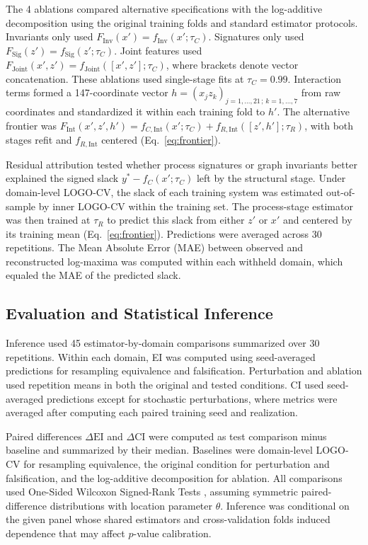 \documentclass{article}
\begin{document}
The 4 ablations compared alternative specifications with the log-additive decomposition using the original training folds and standard estimator protocols. Invariants only used $F_{\mathrm{Inv}}(x') = f_{\mathrm{Inv}}(x'; \tau_C)$. Signatures only used $F_{\mathrm{Sig}}(z') = f_{\mathrm{Sig}}(z'; \tau_C)$. Joint features used $F_{\mathrm{Joint}}(x', z') = f_{\mathrm{Joint}}([x', z']; \tau_C)$, where brackets denote vector concatenation. These ablations used single-stage fits at $\tau_C = 0.99$. Interaction terms formed a 147-coordinate vector $h = {(x_j z_k)}_{j=1,\ldots,21\,;\,k=1,\ldots,7}$ from raw coordinates and standardized it within each training fold to $h'$. The alternative frontier was $F_{\mathrm{Int}}(x', z', h') = f_{C,\mathrm{Int}}(x'; \tau_C) + f_{R,\mathrm{Int}}([z', h']; \tau_R)$, with both stages refit and $f_{R,\mathrm{Int}}$ centered (Eq.~\eqref{eq:frontier}).

Residual attribution tested whether process signatures or graph invariants better explained the signed slack $y^{*} - f_C(x'; \tau_C)$ left by the structural stage. Under domain-level LOGO-CV, the slack of each training system was estimated out-of-sample by inner LOGO-CV within the training set. The process-stage estimator was then trained at $\tau_R$ to predict this slack from either $z'$ or $x'$ and centered by its training mean (Eq.~\eqref{eq:frontier}). Predictions were averaged across 30 repetitions. The Mean Absolute Error (MAE) between observed and reconstructed log-maxima was computed within each withheld domain, which equaled the MAE of the predicted slack.

\subsection*{Evaluation and Statistical Inference}
\label{sec:si-stat-conventions}
Inference used 45 estimator-by-domain comparisons summarized over 30 repetitions. Within each domain, EI was computed using seed-averaged predictions for resampling equivalence and falsification. Perturbation and ablation used repetition means in both the original and tested conditions. CI used seed-averaged predictions except for stochastic perturbations, where metrics were averaged after computing each paired training seed and realization.

Paired differences $\Delta\mathrm{EI}$ and $\Delta\mathrm{CI}$ were computed as test comparison minus baseline and summarized by their median. Baselines were domain-level LOGO-CV for resampling equivalence, the original condition for perturbation and falsification, and the log-additive decomposition for ablation. All comparisons used One-Sided Wilcoxon Signed-Rank Tests \citep{ref45}, assuming symmetric paired-difference distributions with location parameter $\theta$. Inference was conditional on the given panel whose shared estimators and cross-validation folds induced dependence that may affect $p$-value calibration.
\end{document}
